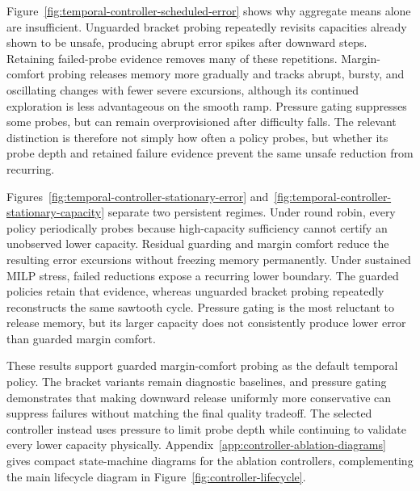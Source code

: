 \documentclass[sigconf, nonacm]{acmart}
\begin{document}
Figure~\ref{fig:temporal-controller-scheduled-error} shows why aggregate means alone
are insufficient. Unguarded bracket probing repeatedly revisits capacities
already shown to be unsafe, producing abrupt error spikes after downward
steps. Retaining failed-probe evidence removes many of these repetitions.
Margin-comfort probing releases memory more gradually and tracks abrupt,
bursty, and oscillating changes with fewer severe excursions, although its
continued exploration is less advantageous on the smooth ramp. Pressure
gating suppresses some probes, but can remain overprovisioned after difficulty
falls. The relevant distinction is therefore not simply how often a policy
probes, but whether its probe depth and retained failure evidence prevent the
same unsafe reduction from recurring.



Figures~\ref{fig:temporal-controller-stationary-error}
and~\ref{fig:temporal-controller-stationary-capacity} separate two persistent
regimes. Under round robin, every policy periodically probes because
high-capacity sufficiency cannot certify an unobserved lower capacity.
Residual guarding and margin comfort reduce the resulting error excursions
without freezing memory permanently. Under sustained MILP stress, failed
reductions expose a recurring lower boundary. The guarded policies retain
that evidence, whereas unguarded bracket probing repeatedly reconstructs the
same sawtooth cycle. Pressure gating is the most reluctant to release memory,
but its larger capacity does not consistently produce lower error than guarded
margin comfort.

These results support guarded margin-comfort probing as the default temporal
policy. The bracket variants remain diagnostic baselines, and pressure gating
demonstrates that making downward release uniformly more conservative can
suppress failures without matching the final quality tradeoff. The selected
controller instead uses pressure to limit probe depth while continuing to
validate every lower capacity physically.
Appendix~\ref{app:controller-ablation-diagrams} gives compact state-machine
diagrams for the ablation controllers, complementing the main lifecycle
diagram in Figure~\ref{fig:controller-lifecycle}.
\end{document}
